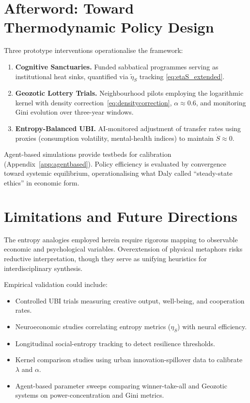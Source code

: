 \documentclass[12pt,a4paper]{article}
\theoremstyle{definition}
\begin{document}
\section*{Afterword: Toward Thermodynamic Policy Design}

Three prototype interventions operationalise the framework:

\begin{enumerate}[leftmargin=*]
  \item \textbf{Cognitive Sanctuaries.} Funded sabbatical programmes serving
    as institutional heat sinks, quantified via $\tilde{\eta}_S$ tracking
    \eqref{eq:etaS_extended}.
  \item \textbf{Geozotic Lottery Trials.} Neighbourhood pilots employing the
    logarithmic kernel with density correction~\eqref{eq:densitycorrection},
    $\alpha \approx 0.6$, and monitoring Gini evolution over three-year
    windows.
  \item \textbf{Entropy-Balanced UBI.} AI-monitored adjustment of transfer
    rates using proxies (consumption volatility, mental-health indices) to
    maintain $\dot{S} \approx 0$.
\end{enumerate}

Agent-based simulations provide testbeds for calibration
(Appendix~\ref{app:agentbased}).  Policy efficiency is evaluated by
convergence toward systemic equilibrium, operationalising what Daly called
``steady-state ethics'' in economic form.

\section{Limitations and Future Directions}
\label{sec:limitations}

The entropy analogies employed herein require rigorous mapping to observable
economic and psychological variables.  Overextension of physical metaphors
risks reductive interpretation, though they serve as unifying heuristics for
interdisciplinary synthesis.

Empirical validation could include:

\begin{itemize}[leftmargin=*]
  \item Controlled UBI trials measuring creative output, well-being, and
    cooperation rates.
  \item Neuroeconomic studies correlating entropy metrics ($\eta_S$) with
    neural efficiency.
  \item Longitudinal social-entropy tracking to detect resilience thresholds.
  \item Kernel comparison studies using urban innovation-spillover data to
    calibrate $\lambda$ and $\alpha$.
  \item Agent-based parameter sweeps comparing winner-take-all and Geozotic
    systems on power-concentration and Gini metrics.
\end{itemize}
\end{document}
